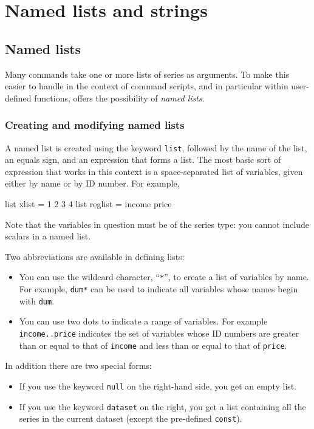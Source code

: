 \chapter{Named lists and strings}
\label{chap-persist}


\section{Named lists}
\label{named-lists}

Many  commands take one or more lists of series as
arguments.  To make this easier to handle in the context of command
scripts, and in particular within user-defined functions, 
offers the possibility of \textit{named lists}.  

\subsection{Creating and modifying named lists}

A named list is created using the keyword \texttt{list}, followed by
the name of the list, an equals sign, and an expression that forms a
list.  The most basic sort of expression that works in this context
is a space-separated list of variables, given either by name or
by ID number.  For example,
%
\begin{code}
list xlist = 1 2 3 4
list reglist = income price 
\end{code}

Note that the variables in question must be of the series type: you
cannot include scalars in a named list.

Two abbreviations are available in defining lists:
\begin{itemize}
\item You can use the wildcard character, ``\texttt{*}'', to create a
  list of variables by name. For example, \texttt{dum*} can be used to
  indicate all variables whose names begin with \texttt{dum}.
\item You can use two dots to indicate a range of variables. For
  example \texttt{income..price} indicates the set of variables whose
  ID numbers are greater than or equal to that of \texttt{income}
  and less than or equal to that of \texttt{price}.
\end{itemize}

In addition there are two special forms:
\begin{itemize}
\item If you use the keyword \texttt{null} on the right-hand side,
  you get an empty list.
\item If you use the keyword \texttt{dataset} on the right, you get
  a list containing all the series in the current dataset (except
  the pre-defined \texttt{const}).
\end{itemize}

